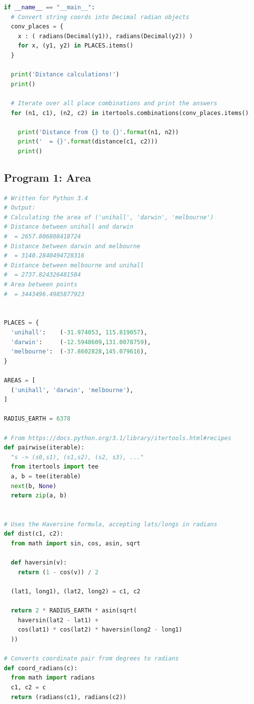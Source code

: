 \documentclass[a4paper,10pt]{article}
\begin{document}
\begin{appendices}
\begin{lstlisting}[language=Python]
if __name__ == "__main__":
  # Convert string coords into Decimal radian objects
  conv_places = {
    x : ( radians(Decimal(y1)), radians(Decimal(y2)) ) 
    for x, (y1, y2) in PLACES.items()
  }

  print('Distance calculations!')
  print()

  # Iterate over all place combinations and print the answers
  for (n1, c1), (n2, c2) in itertools.combinations(conv_places.items(), 2):

    print('Distance from {} to {}'.format(n1, n2))
    print('  = {}'.format(distance(c1, c2)))
    print()
  \end{lstlisting}
  
  \clearpage
  \subsection{Program 1: Area}
  \begin{lstlisting}[language=Python]
# Written for Python 3.4
# Output: 
# Calculating the area of ('unihall', 'darwin', 'melbourne')
# Distance between unihall and darwin
#  = 2657.806808418724
# Distance between darwin and melbourne
#  = 3140.2840494728316
# Distance between melbourne and unihall
#  = 2737.824326481584
# Area between points
#  = 3443496.4985877923


PLACES = {
  'unihall':    (-31.974053, 115.819057),
  'darwin':     (-12.5948609,131.0078759),
  'melbourne':  (-37.8602828,145.079616),
}

AREAS = [
  ('unihall', 'darwin', 'melbourne'),
]

RADIUS_EARTH = 6378

# From https://docs.python.org/3.1/library/itertools.html#recipes
def pairwise(iterable):
  "s -> (s0,s1), (s1,s2), (s2, s3), ..."
  from itertools import tee
  a, b = tee(iterable)
  next(b, None)
  return zip(a, b)


# Uses the Haversine formula, accepting lats/longs in radians
def dist(c1, c2):
  from math import sin, cos, asin, sqrt

  def haversin(v):
    return (1 - cos(v)) / 2

  (lat1, long1), (lat2, long2) = c1, c2

  return 2 * RADIUS_EARTH * asin(sqrt(
    haversin(lat2 - lat1) + 
    cos(lat1) * cos(lat2) * haversin(long2 - long1)
  ))

# Converts coordinate pair from degrees to radians
def coord_radians(c):
  from math import radians
  c1, c2 = c
  return (radians(c1), radians(c2))


\end{lstlisting}
\end{appendices}
\end{document}
